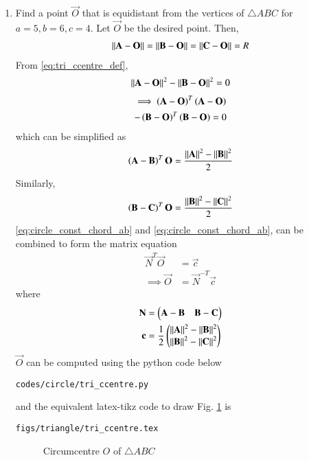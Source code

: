 \begin{enumerate}[label=\thesection.\arabic*.,ref=\thesection.\theenumi]
\item Find a point $\vec{O}$ that is equidistant from the vertices of $\triangle ABC$ for $a = 5, b = 6, c = 4$.
%
\solution Let $\vec{O}$ be the desired point.  Then,
\begin{align}
\label{eq:tri_ccentre_def}
\norm{\vec{A}-\vec{O}} = \norm{\vec{B}-\vec{O}} = 
\norm{\vec{C}-\vec{O}} = R
\end{align}
From \eqref{eq:tri_ccentre_def},
\begin{align}
\label{eq:circle_const_AB}
\norm{\vec{A}-\vec{O}}^2 - \norm{\vec{B}-\vec{O}}^2  = 0
\end{align}
\begin{multline}
\implies \left(\mathbf{A}-\mathbf{O}\right)^T\left(\mathbf{A}-\mathbf{O}\right) 
\\
- \left(\mathbf{B}-\mathbf{O}\right)^T\left(\mathbf{B}-\mathbf{O}\right) = 0
\end{multline}
%
which can be simplified as
\begin{align}
\label{eq:circle_const_chord_ab}
\brak{\vec{A}-\vec{B}}^T\vec{O} =   \frac{\norm{\vec{A}}^2- \norm{\vec{B}}^2}{2}
\end{align}
Similarly,
\begin{align}
\label{eq:circle_const_chord_bc}
\brak{\vec{B}-\vec{C}}^T\vec{O} =   \frac{\norm{\vec{B}}^2- \norm{\vec{C}}^2}{2}
\end{align}
%
\eqref{eq:circle_const_chord_ab} and \eqref{eq:circle_const_chord_ab}, can be combined to form the matrix equation 
%
\begin{align}
\vec{N}^T\vec{O} &= \vec{c}
\\
\implies \vec{O} &= \vec{N}^{-T} \vec{c}
\label{eq:circle_const_chord_mat}
\end{align}
%
where 
%
\begin{align}
\mathbf{N} &= \begin{pmatrix}\mathbf{A}-\mathbf{B} & \mathbf{B}-\mathbf{C}\end{pmatrix}
\\
\mathbf{c} &= \frac{1}{2}\begin{pmatrix}\left\lVert\mathbf{A}\right\rVert^2- \left\lVert\mathbf{B}\right\rVert^2 \\ \left\lVert\mathbf{B}\right\rVert^2- \left\lVert\mathbf{C}\right\rVert^2\end{pmatrix}
\end{align}
%
$\vec{O}$ can be computed using 
%
the python code below
%
\begin{lstlisting}
codes/circle/tri_ccentre.py
\end{lstlisting}
%
and the equivalent latex-tikz code to draw Fig. \ref{fig:tri_ccentre} is
%
\begin{lstlisting}
figs/triangle/tri_ccentre.tex
\end{lstlisting}
%
\fi
\begin{figure}[!ht]
	\begin{center}
		
		\resizebox{\columnwidth}{!}{}
	\end{center}
	\caption{Circumcentre $O$ of $\triangle ABC$}
	\label{fig:tri_ccentre}	
\end{figure}
\end{enumerate}

